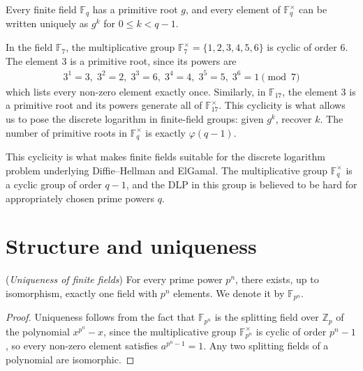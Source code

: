 \documentclass[a4paper, 12pt]{book} %
\begin{document}
\begin{corollary}
    Every finite field $\mathbb{F}_q$ has a primitive root $g$, and every element of $\mathbb{F}_q^\times$ can be written uniquely as $g^k$ for $0 \leq k < q - 1$.
\end{corollary}

\begin{example}
    In the field $\mathbb{F}_7$, the multiplicative group $\mathbb{F}_7^\times = \{1,2,3,4,5,6\}$ is cyclic of order $6$. The element $3$ is a primitive root, since its powers are
    \begin{align}
        3^1=3,\; 3^2=2,\; 3^3=6,\; 3^4=4,\; 3^5=5,\; 3^6=1 \pmod 7
    \end{align}
    which lists every non-zero element exactly once. Similarly, in $\mathbb{F}_{17}$, the element $3$ is a primitive root and its powers generate all of $\mathbb{F}_{17}^\times$. This cyclicity is what allows us to pose the discrete logarithm in finite-field groups: given $g^k$, recover $k$. The number of primitive roots in $\mathbb{F}_q^\times$ is exactly $\varphi(q-1)$.
\end{example}

\begin{remark}
    This cyclicity is what makes finite fields suitable for the discrete logarithm problem underlying Diffie--Hellman and ElGamal. The multiplicative group $\mathbb{F}_q^\times$ is a cyclic group of order $q - 1$, and the DLP in this group is believed to be hard for appropriately chosen prime powers $q$.
\end{remark}

\section{Structure and uniqueness}

\begin{theorem}
    (\emph{Uniqueness of finite fields}) For every prime power $p^n$, there exists, up to isomorphism, exactly one field with $p^n$ elements. We denote it by $\mathbb{F}_{p^n}$.
\end{theorem}

\begin{proof}
    Uniqueness follows from the fact that $\mathbb{F}_{p^n}$ is the splitting field over $\mathbb{Z}_p$ of the polynomial $x^{p^n} - x$, since the multiplicative group $\mathbb{F}_{p^n}^\times$ is cyclic of order $p^n - 1$, so every non-zero element satisfies $a^{p^n-1} = 1$. Any two splitting fields of a polynomial are isomorphic.
\end{proof}
\end{document}
